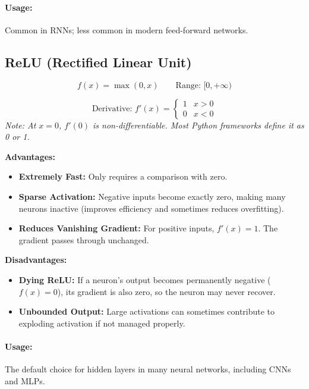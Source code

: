 \paragraph{Usage:} Common in RNNs; less common in modern feed-forward networks.

\subsection{ReLU (Rectified Linear Unit)}

\begin{equation}
f(x) = \max(0, x) \qquad \text{Range: } [0, +\infty)
\end{equation}

\begin{equation}
\text{Derivative: } f'(x) = \begin{cases} 1 & x > 0 \\ 0 & x < 0 \end{cases}
\end{equation}
\reluplot
\textit{Note: At $x = 0$, $f'(0)$ is non-differentiable. Most Python frameworks define it as 0 or 1.}

\begin{advbox}
\textbf{Advantages:}
\begin{itemize}
    \item \textbf{Extremely Fast:} Only requires a comparison with zero.
    \item \textbf{Sparse Activation:} Negative inputs become exactly zero, making many neurons inactive (improves efficiency and sometimes reduces overfitting).
    \item \textbf{Reduces Vanishing Gradient:} For positive inputs, $f'(x) = 1$. The gradient passes through unchanged.
\end{itemize}

\tcbline

\textbf{Disadvantages:}
\begin{itemize}
    \item \textbf{Dying ReLU:} If a neuron's output becomes permanently negative ($f(x) = 0$), its gradient is also zero, so the neuron may never recover.
    \item \textbf{Unbounded Output:} Large activations can sometimes contribute to exploding activation if not managed properly.
\end{itemize}
\end{advbox}

\paragraph{Usage:} The default choice for hidden layers in many neural networks, including CNNs and MLPs.


